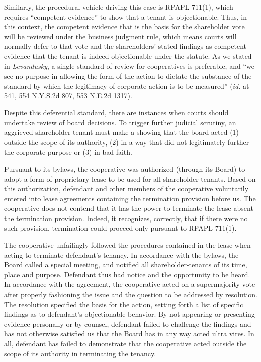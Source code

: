 Similarly, the procedural vehicle driving this case is RPAPL 711(1), which
requires ``competent evidence'' to show that a tenant is objectionable. Thus, in
this context, the competent evidence that is the basis for the shareholder vote
will be reviewed under the business judgment rule, which means courts will
normally defer to that vote and the shareholders' stated findings as competent
evidence that the tenant is indeed objectionable under the statute. As we stated
in \textit{Levandusky}, a single standard of review for cooperatives is
preferable, and ``we see no purpose in allowing the form of the action to
dictate the substance of the standard by which the legitimacy of corporate
action is to be measured'' (\emph{id.} at 541, 554 N.Y.S.2d 807, 553 N.E.2d
1317).

Despite this deferential standard, there are instances when courts should
undertake review of board decisions. To trigger further judicial scrutiny, an
aggrieved shareholder-tenant must make a showing that the board acted (1)
outside the scope of its authority, (2) in a way that did not legitimately
further the corporate purpose or (3) in bad faith.



Pursuant to its bylaws, the cooperative was authorized (through its Board) to
adopt a form of proprietary lease to be used for all shareholder-tenants. Based
on this authorization, defendant and other members of the cooperative
voluntarily entered into lease agreements containing the termination provision
before us. The cooperative does not contend that it has the power to terminate
the lease absent the termination provision. Indeed, it recognizes, correctly,
that if there were no such provision, termination could proceed only pursuant to
RPAPL 711(1).

The cooperative unfailingly followed the procedures contained in the lease when
acting to terminate defendant's tenancy. In accordance with the bylaws, the
Board called a special meeting, and notified all shareholder-tenants of its
time, place and purpose. Defendant thus had notice and the opportunity to be
heard. In accordance with the agreement, the cooperative acted on a
supermajority vote after properly fashioning the issue and the question to be
addressed by resolution. The resolution specified the basis for the action,
setting forth a list of specific findings as to defendant's objectionable
behavior. By not appearing or presenting evidence personally or by counsel,
defendant failed to challenge the findings and has not otherwise satisfied us
that the Board has in any way acted ultra vires. In all, defendant has failed to
demonstrate that the cooperative acted outside the scope of its authority in
terminating the tenancy.


